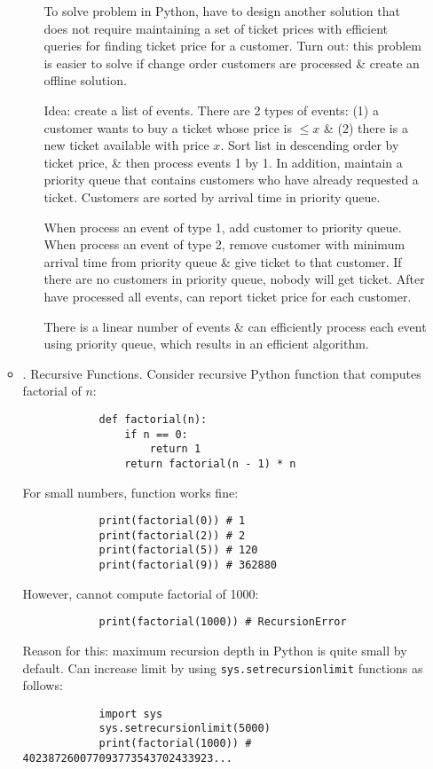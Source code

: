 \documentclass{article}
\begin{document}
\begin{itemize}
\begin{itemize}
\begin{itemize}
			To solve problem in Python, have to design another solution that does not require maintaining a set of ticket prices with efficient queries for finding ticket price for a customer. Turn out: this problem is easier to solve if change order customers are processed \& create an offline solution.
			
			Idea: create a list of events. There are 2 types of events: (1) a customer wants to buy a ticket whose price is $\le x$ \& (2) there is a new ticket available with price $x$. Sort list in descending order by ticket price, \& then process events 1 by 1. In addition, maintain a priority queue that contains customers who have already requested a ticket. Customers are sorted by arrival time in priority queue.
			
			When process an event of type 1, add customer to priority queue. When process an event of type 2, remove customer with minimum arrival time from priority queue \& give ticket to that customer. If there are no customers in priority queue, nobody will get ticket. After have processed all events, can report ticket price for each customer.
			
			There is a linear number of events \& can efficiently process each event using priority queue, which results in an efficient algorithm.
		\end{itemize}
		\item {. Recursive Functions.} Consider recursive Python function that computes factorial of $n$:
		\begin{verbatim}
			def factorial(n):
			    if n == 0:
			        return 1
			    return factorial(n - 1) * n
		\end{verbatim}
		For small numbers, function works fine:
		\begin{verbatim}
			print(factorial(0)) # 1
			print(factorial(2)) # 2
			print(factorial(5)) # 120
			print(factorial(9)) # 362880
		\end{verbatim}
		However, cannot compute factorial of 1000:
		\begin{verbatim}
			print(factorial(1000)) # RecursionError
		\end{verbatim}
		Reason for this: maximum recursion depth in Python is quite small by default. Can increase limit by using {\tt sys.setrecursionlimit} functions as follows:
		\begin{verbatim}
			import sys
			sys.setrecursionlimit(5000)
			print(factorial(1000)) # 402387260077093773543702433923...
		\end{verbatim}
		

\end{itemize}
\end{itemize}
\end{document}
